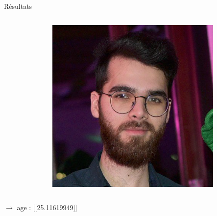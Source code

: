 \documentclass[compress]{beamer}
\begin{document}
\begin{frame}{Résultats}
  \begin{columns}
    \begin{column}{0.6\linewidth}
      \inputminted[fontsize=\scriptsize]{python}{code1.py}
    \end{column}
    \begin{column}{0.4\linewidth}
      \centering
      \includegraphics[width=\linewidth]{resources/flo}
    \end{column}
  \end{columns}
    $\rightarrow$ age : [[25.11619949]]
\end{frame}
\end{document}
